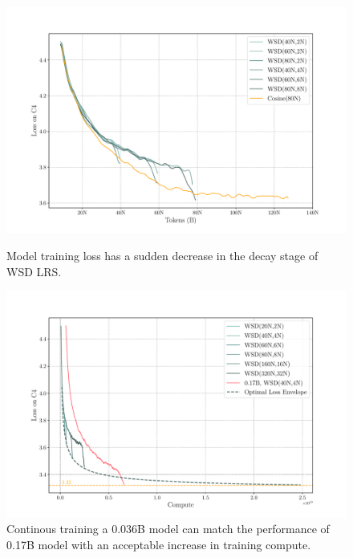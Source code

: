 \vspace{-2mm}
\begin{figure}[htbp]
    \centering
    \begin{minipage}{0.48\linewidth}
        \centering
        \includegraphics[width=1.05\linewidth]{Fig/WSD_diff_dcay.pdf}
        \caption{ Model training loss has a sudden decrease in the decay stage of WSD LRS. }
        \label{fig:wsd_diff_dcay}
        \vspace{0.47cm}
    \end{minipage}
    \hfill %
    \begin{minipage}{0.48\linewidth}
        \centering
    \includegraphics[width=1.05\linewidth]{Fig/continuous_train.pdf}
    \caption{Continous training a 0.036B model can match the performance of 0.17B model with an acceptable increase in training compute.}
    \label{fig:continuoustrain}
    \end{minipage}
\end{figure}



